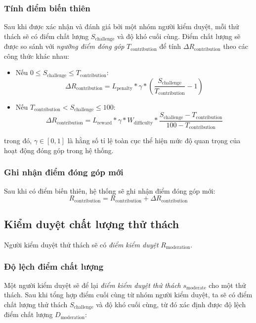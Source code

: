 \subsubsection{Tính điểm biến thiên}

Sau khi được xác nhận và đánh giá bởi một nhóm người kiểm duyệt, mỗi thử thách sẽ có điểm chất lượng $S_{\text{challenge}}$ và độ khó cuối cùng.
Điểm chất lượng sẽ được so sánh với \textit{ngưỡng điểm đóng góp} $T_{\text{contribution}}$ để tính $\Delta R_{\text{contribution}}$ theo các công thức khác nhau:

\begin{itemize}
  \item Nếu $0 \leq S_{\text{challenge}} \leq  T_{\text{contribution}}$:
        \[\Delta R_{\text{contribution}} = L_{\text{penalty}} * \gamma * \left( \frac{S_{\text{challenge}}}{T_{\text{contribution}}} - 1 \right)    \]
  \item Nếu $T_{\text{contribution}} < S_{\text{challenge}} \leq 100$:
        \[\Delta R_{\text{contribution}} = L_{\text{reward}} * \gamma * W_{\text{difficulty}} * \frac{S_{\text{challenge}} - T_{\text{contribution}}}{100-T_{\text{contribution}}}    \]
\end{itemize}
trong đó, $\gamma \in [0, 1]$ là hằng số tỉ lệ toàn cục thể hiện mức độ quan trọng của hoạt động đóng góp trong hệ thống.

\subsubsection{Ghi nhận điểm đóng góp mới}

Sau khi có điểm biến thiên, hệ thống sẽ ghi nhận điểm đóng góp mới:
\[R_{\text{contribution}} = R_{\text{contribution}} + \Delta R_{\text{contribution}}\]

\subsection{Kiểm duyệt chất lượng thử thách}

Người kiểm duyệt thử thách sẽ có \textit{điểm kiểm duyệt} $R_{\text{moderation}}$.

\subsubsection{Độ lệch điểm chất lượng}

Một người kiểm duyệt sẽ để lại \textit{điểm kiểm duyệt thử thách} $s_{\text{moderate}}$ cho một thử thách. Sau khi tổng hợp điểm cuối cùng từ nhóm người kiểm duyệt,
ta sẽ có điểm chất lượng thử thách $S_{\text{challenge}}$ và độ khó cuối cùng, từ đó xác định được độ lệch điểm chất lượng $D_{\text{moderation}}$:

